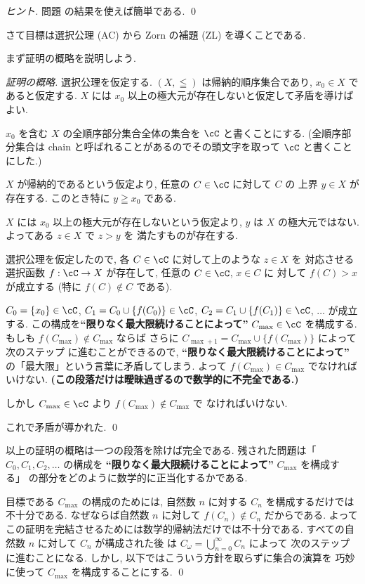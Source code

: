 \documentclass[12pt,twoside]{jarticle}
\begin{document}
\begin{proof}[ヒント]
  問題  の結果を使えば簡単である. \qed
\end{proof}

さて目標は選択公理 (AC) から Zorn の補題 (ZL) を導くことである. 

まず証明の概略を説明しよう.

\begin{proof}[証明の概略]
  選択公理を仮定する.
  $(X,\leqq)$ は帰納的順序集合であり, $x_0\in X$ であると仮定する.
  $X$ には $x_0$ 以上の極大元が存在しないと仮定して矛盾を導けばよい.
  
  $x_0$ を含む $X$ の全順序部分集合全体の集合を $\cC$ と書くことにする. 
  (全順序部分集合は chain と呼ばれることがあるのでその頭文字を取って $\cC$ 
  と書くことにした.)
  
  $X$ が帰納的であるという仮定より, 任意の $C\in \cC$ に対して $C$ の
  上界 $y\in X$ が存在する. このとき特に $y\geqq x_0$ である.
  
  $X$ には $x_0$ 以上の極大元が存在しないという仮定より, %
  $y$ は $X$ の極大元ではない. よってある $z\in X$ で $z>y$ を
  満たすものが存在する.
  
  選択公理を仮定したので, 各 $C\in\cC$ に対して上のような $z\in X$ を
  対応させる選択函数 $f:\cC\to X$ が存在して, 任意の $C\in\cC$, $x\in C$ に
  対して $f(C)>x$ が成立する (特に $f(C)\not\in C$ である).
  
  $C_0=\{x_0\}\in\cC$, 
  $C_1=C_0\cup\{f(C_0)\}\in\cC$, 
  $C_2=C_1\cup\{f(C_1)\}\in\cC$, $\ldots$ が成立する.
  この構成を{\bf ``限りなく最大限続けることによって''} $C_{\max}\in \cC$ 
  を構成する. 
  もしも $f(C_{\max})\not\in C_{\max}$ ならば
  さらに $C_{\max+1} = C_{\max}\cup\{f(C_{\max})\}$ によって次のステップ
  に進むことができるので, {\bf ``限りなく最大限続けることによって''}
  の「最大限」という言葉に矛盾してしまう.
  よって $f(C_{\max})\in C_{\max}$ でなければいけない.
  {\bf (この段落だけは曖昧過ぎるので数学的に不完全である.)}
  
  しかし $C_{\max}\in\cC$ より $f(C_{\max})\not\in C_{\max}$ で
  なければいけない.
  
  これで矛盾が導かれた.
  \qed  
\end{proof}

以上の証明の概略は一つの段落を除けば完全である. 
残された問題は「$C_0,C_1,C_2,\ldots$ の構成を
{\bf ``限りなく最大限続けることによって''} $C_{\max}$ を構成する」
の部分をどのように数学的に正当化するかである.

\begin{rem}
  目標である $C_{\max}$ の構成のためには, 
  自然数 $n$ に対する $C_n$ を構成するだけでは不十分である.
  なぜならば自然数 $n$ に対して $f(C_n)\not\in C_n$ だからである.
  よってこの証明を完結させるためには数学的帰納法だけでは不十分である.
  すべての自然数 $n$ に対して $C_n$ が構成された後
  は $C_\omega = \bigcup_{n=0}^\infty C_n$ によって
  次のステップに進むことになる. 
  しかし, 以下ではこういう方針を取らずに集合の演算を
  巧妙に使って $C_{\max}$ を構成することにする.
  \qed
\end{rem}
\end{document}
